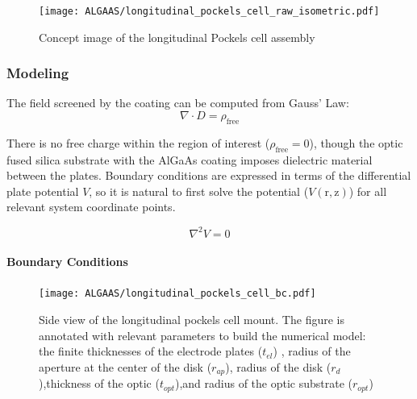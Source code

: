 \begin{figure}[H]
\begin{center}
\texttt{[image: ALGAAS/longitudinal\_pockels\_cell\_raw\_isometric.pdf]}
\end{center}
\caption{Concept image of the longitudinal Pockels cell assembly}
\label{fig:pckcellconcept}
\end{figure}

\subsubsection*{Modeling}
The field screened by the coating can be computed from Gauss' Law:
\begin{equation}
\nabla \cdot D = \rho_\mathrm{free}
\end{equation}

\noindent There is no free charge within the region of interest ($\rho_\mathrm{free}=0$), though the optic fused silica substrate with the AlGaAs coating imposes dielectric material between the plates. Boundary conditions are expressed in terms of the differential plate potential $V$, so it is natural to first solve the potential ($V(\mathrm{r, z})$) for all relevant system coordinate points.  

\begin{equation}\label{eq:cyllap}
\nabla^2 V = 0
\end{equation}

\paragraph*{Boundary Conditions}

\begin{figure}[H]
  \centering
  \texttt{[image: ALGAAS/longitudinal\_pockels\_cell\_bc.pdf]}
\caption{Side view of the longitudinal pockels cell mount. The figure is annotated with relevant parameters to build the numerical model: the finite thicknesses of the electrode plates ($t_{el}$) , radius of the aperture at the center of the disk ($r_{ap}$), radius of the disk ($r_d$),thickness of the optic ($t_{opt}$),and radius of the optic substrate ($r_{opt}$)}
  \label{fig:laplacecoords}
\end{figure}


